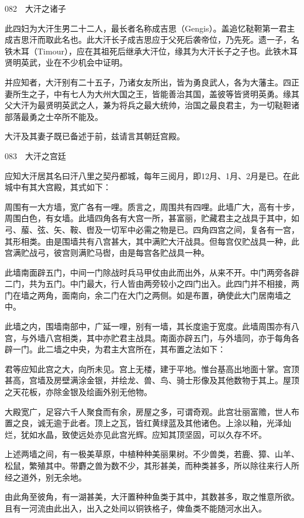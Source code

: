 \documentclass[12pt,UTF8]{ctexbook}
\begin{document}
082　大汗之诸子

此四妇为大汗生男二十二人，最长者名称成吉思（Gengis）。盖追忆鞑靼第一君主成吉思汗而取此名也。此大汗长子成吉思应于父死后袭帝位，乃先死。遗一子，名铁木耳（Timour），应在其祖死后继承大汗位，缘其为大汗长子之子也。此铁木耳贤明英武，业在不少机会中证明。

并应知者，大汗别有二十五子，乃诸女友所出，皆为勇良武人，各为大藩主。四正妻所生之子，中有七人为大州大国之王，皆能善治其国，盖彼等皆贤明英勇。缘其父大汗为最贤明英武之人，兼为将兵之最大统帅，治国之最良君主，为一切鞑靼诸部落最勇之士卒所不能及。

大汗及其妻子既已备述于前，兹请言其朝廷宫殿。





083　大汗之宫廷

应知大汗居其名曰汗八里之契丹都城，每年三阅月，即12月、1月、2月是已。在此城中有其大宫殿，其式如下：

周围有一大方墙，宽广各有一哩。质言之，周围共有四哩。此墙广大，高有十步，周围白色，有女墙。此墙四角各有大宫一所，甚富丽，贮藏君主之战具于其中，如弓、菔、弦、矢、鞍、辔及一切军中必需之物是已。四角四宫之间，复各有一宫，其形相类。由是围墙共有八宫甚大，其中满贮大汗战具。但每宫仅贮战具一种，此宫满贮战弓，彼宫则满贮马辔，由是每宫各贮战具一种。

此墙南面辟五门，中间一门除战时兵马甲仗由此而出外，从来不开。中门两旁各辟二门，共为五门。中门最大，行人皆由两旁较小之四门出入。此四门并不相接，两门在墙之两角，面南向，余二门在大门之两侧。如是布置，确使此大门居南墙之中。

此墙之内，围墙南部中，广延一哩，别有一墙，其长度逾于宽度。此墙周围亦有八宫，与外墙八宫相类，其中亦贮君主战具。南面亦辟五门，与外墙同，亦于每角各辟一门。此二墙之中央，为君主大宫所在，其布置之法如下：

君等应知此宫之大，向所未见。宫上无楼，建于平地。惟台基高出地面十掌。宫顶甚高，宫墙及房壁满涂金银，并绘龙、兽、鸟、骑士形像及其他数物于其上。屋顶之天花板，亦除金银及绘画外别无他物。

大殿宽广，足容六千人聚食而有余，房屋之多，可谓奇观。此宫壮丽富赡，世人布置之良，诚无逾于此者。顶上之瓦，皆红黄绿蓝及其他诸色。上涂以釉，光泽灿烂，犹如水晶，致使远处亦见此宫光辉。应知其顶坚固，可以久存不坏。

上述两墙之间，有一极美草原，中植种种美丽果树。不少兽类，若鹿、獐、山羊、松鼠，繁殖其中。带麝之兽为数不少，其形甚美，而种类甚多，所以除往来行人所经之道外，别无余地。

由此角至彼角，有一湖甚美，大汗置种种鱼类于其中，其数甚多，取之惟意所欲。且有一河流由此出入，出入之处间以铜铁格子，俾鱼类不能随河水出入。
\end{document}
